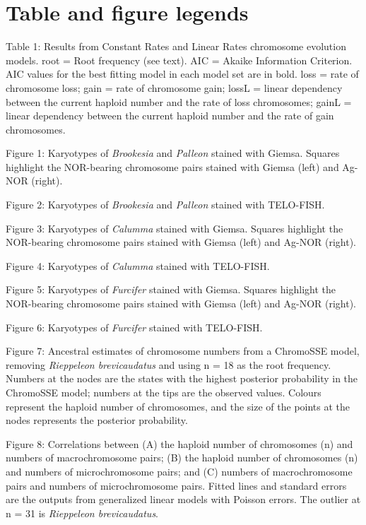 \documentclass[a4paper, 12pt]{article}
\begin{document}
\newpage
\section{Table and figure legends}

Table 1: Results from Constant Rates and Linear Rates chromosome evolution models. root = Root frequency (see text). AIC = Akaike Information Criterion. AIC values for the best fitting model in each model set are in bold. loss = rate of chromosome loss; gain = rate of chromosome gain; lossL = linear dependency between the current haploid number and the rate of loss chromosomes; gainL = linear dependency between the current haploid number and the rate of gain chromosomes.

Figure 1: Karyotypes of \textit{Brookesia} and \textit{Palleon} stained with Giemsa. Squares highlight the NOR-bearing chromosome pairs stained with Giemsa (left) and Ag-NOR (right).

Figure 2: Karyotypes of \textit{Brookesia} and \textit{Palleon} stained with TELO-FISH.

Figure 3: Karyotypes of \textit{Calumma} stained with Giemsa. Squares highlight the NOR-bearing chromosome pairs stained with Giemsa (left) and Ag-NOR (right).

Figure 4: Karyotypes of \textit{Calumma} stained with TELO-FISH.

Figure 5: Karyotypes of \textit{Furcifer} stained with Giemsa. Squares highlight the NOR-bearing chromosome pairs stained with Giemsa (left) and Ag-NOR (right).

Figure 6: Karyotypes of \textit{Furcifer} stained with TELO-FISH.

Figure 7: Ancestral estimates of chromosome numbers from a ChromoSSE model, removing \textit{Rieppeleon brevicaudatus} and using n = 18 as the root frequency. Numbers at the nodes are the states with the highest posterior probability in the ChromoSSE model; numbers at the tips are the observed values. Colours represent the haploid number of chromosomes, and the size of the points at the nodes represents the posterior probability.

Figure 8: Correlations between (A) the haploid number of chromosomes (n) and numbers of macrochromosome pairs; (B) the haploid number of chromosomes (n) and numbers of microchromosome pairs; and (C) numbers of macrochromosome pairs and numbers of microchromosome pairs. Fitted lines and standard errors are the outputs from generalized linear models with Poisson errors. The outlier at n = 31 is \textit{Rieppeleon brevicaudatus}.
\end{document}

